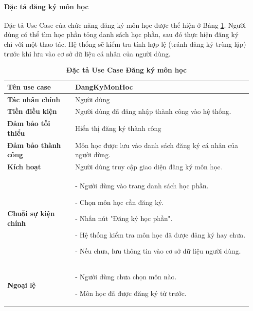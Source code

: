 \documentclass{article}
\begin{document}
	\paragraph{Đặc tả đăng ký môn học} \mbox{}
	
	Đặc tả Use Case của chức năng đăng ký môn học được thể hiện ở Bảng \ref{tab33}. Người dùng có thể tìm học phần tỏng danh sách học phần, sau đó thực hiện đăng ký chỉ với một thao tác. Hệ thống sẽ kiểm tra tính hợp lệ (tránh đăng ký trùng lặp) trước khi lưu vào cơ sở dữ liệu cá nhân của người dùng.
	
	\begin{table}[H]
		\centering
		\caption [Đặc tả Use Case Đăng ký môn học]{\bfseries \fontsize{12pt}{0pt}\selectfont Đặc tả Use Case Đăng ký môn học}
		\label{tab33}
		\begin{tabular}{|p{4cm}|p{10.5cm}|}
			\hline
			\textbf{Tên use case} & DangKyMonHoc \\
			\hline
			\textbf{Tác nhân chính} & Người dùng \\
			\hline
			\textbf{Tiền điều kiện} & Người dùng đã đăng nhập thành công vào hệ thống. \\
			\hline
			\textbf{Đảm bảo tối thiểu} & Hiển thị đăng ký thành công \\
			\hline
			\textbf{Đảm bảo thành công} & Môn học được lưu vào danh sách đăng ký cá nhân của người dùng. \\
			\hline
			\textbf{Kích hoạt} & Người dùng truy cập giao diện đăng ký môn học. \\
			\hline
			\textbf{Chuỗi sự kiện chính} &
			- Người dùng vào trang danh sách học phần.
			
			- Chọn môn học cần đăng ký.
			
			- Nhấn nút "Đăng ký học phần".
			
			- Hệ thống kiểm tra môn học đã được đăng ký hay chưa.
			
			- Nếu chưa, lưu thông tin vào cơ sở dữ liệu người dùng.
			\\
			\hline
			\textbf{Ngoại lệ} &
			- Người dùng chưa chọn môn nào.
			
			- Môn học đã được đăng ký từ trước.
			\\
			\hline
		\end{tabular}
	\end{table}
	
\end{document}
